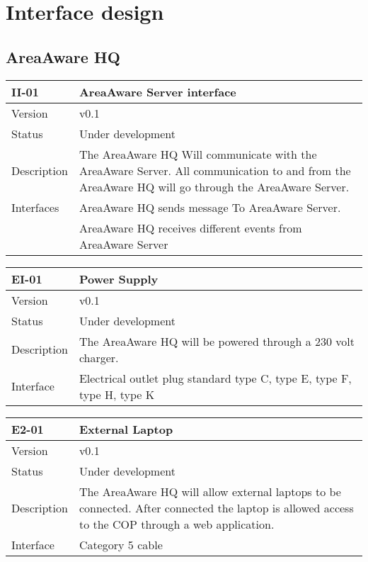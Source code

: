 \label{chp_interfaceDesign}
\chapter{Interface design}

\section{AreaAware HQ}

\begin{longtable}{| p{3.5cm} |  p{10cm} | }
	\hline
	\textbf{II-01} &  \textbf{AreaAware Server interface } \\
	\hline
	Version & v0.1 \\
	\hline
	Status & Under development \\
	\hline
	 Description & The AreaAware HQ Will communicate with the AreaAware Server. All communication to and from the AreaAware HQ will go through the AreaAware Server. 
	  \\
	\hline
	 Interfaces & AreaAware HQ sends message To AreaAware Server.  \\
					   & AreaAware HQ receives different events from AreaAware Server  \\
	\hline
\end{longtable}


\begin{longtable}{| p{3.5cm} |  p{10cm} | }
	\hline
	\textbf{EI-01} &  \textbf{Power Supply} \\
	\hline
	Version & v0.1 \\
	\hline
	Status & Under development \\
	\hline
	Description & The AreaAware HQ will be powered through a 230 volt charger.	\\
	\hline
	Interface &  Electrical outlet plug standard type C, type E,  type F,  type H, type K \\
	\hline
\end{longtable}

\begin{longtable}{| p{3.5cm} |  p{10cm} | }
	\hline
	\textbf{E2-01} &  \textbf{External Laptop} \\
	\hline
	Version & v0.1 \\
	\hline
	Status & Under development \\
	\hline
	Description & The AreaAware HQ will allow external laptops to be connected. After connected the laptop is allowed access to the COP through a web application.	\\
	\hline
	Interface & Category 5 cable \\
	\hline
\end{longtable}

